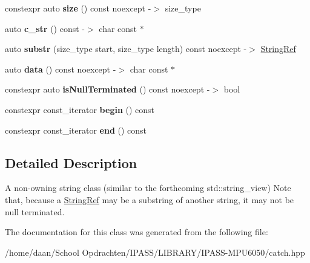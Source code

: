 \begin{DoxyCompactItemize}
constexpr auto {\bfseries size} () const noexcept -\/$>$ size\+\_\+type
\item 
\mbox{\label{classCatch_1_1StringRef_a1669cb2765e820ca258159676cbd82a5}} 
auto {\bfseries c\+\_\+str} () const -\/$>$ char const $\ast$
\item 
\mbox{\label{classCatch_1_1StringRef_a594bc3e10ffad77df92f7d1a4c99d7ff}} 
auto {\bfseries substr} (size\+\_\+type start, size\+\_\+type length) const noexcept -\/$>$ \hyperlink{classCatch_1_1StringRef}{String\+Ref}
\item 
\mbox{\label{classCatch_1_1StringRef_ab0f85edde9f97153fc758fac3bb14507}} 
auto {\bfseries data} () const noexcept -\/$>$ char const $\ast$
\item 
\mbox{\label{classCatch_1_1StringRef_a646e58f5f4e1f5e82cfba06d9fd5d016}} 
constexpr auto {\bfseries is\+Null\+Terminated} () const noexcept -\/$>$ bool
\item 
\mbox{\label{classCatch_1_1StringRef_ab0adc7198d60867c2842b998ae456795}} 
constexpr const\+\_\+iterator {\bfseries begin} () const
\item 
\mbox{\label{classCatch_1_1StringRef_a3ce9afc711b559d6cc59666898fc0828}} 
constexpr const\+\_\+iterator {\bfseries end} () const
\end{DoxyCompactItemize}


\subsection{Detailed Description}
A non-\/owning string class (similar to the forthcoming std\+::string\+\_\+view) Note that, because a \hyperlink{classCatch_1_1StringRef}{String\+Ref} may be a substring of another string, it may not be null terminated. 

The documentation for this class was generated from the following file\+:\begin{DoxyCompactItemize}
\item 
/home/daan/\+School Opdrachten/\+I\+P\+A\+S\+S/\+L\+I\+B\+R\+A\+R\+Y/\+I\+P\+A\+S\+S-\/\+M\+P\+U6050/catch.\+hpp\end{DoxyCompactItemize}
